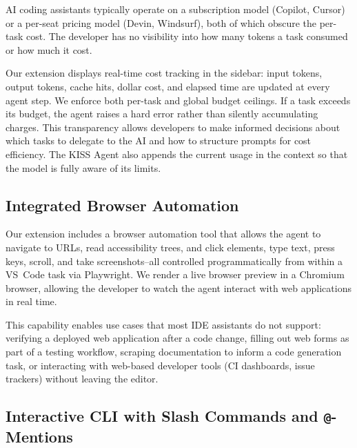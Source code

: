 \documentclass{article}
\begin{document}
AI coding assistants typically operate on a subscription model (Copilot, Cursor) or a per-seat pricing model (Devin, Windsurf), both of which obscure the per-task cost.  The developer has no visibility into how many tokens a task consumed or how much it cost.

Our extension displays real-time cost tracking in the sidebar: input tokens, output tokens, cache hits, dollar cost, and elapsed time are updated at every agent step.  We enforce both per-task and global budget ceilings.  If a task exceeds its budget, the agent raises a hard error rather than silently accumulating charges.  This transparency allows developers to make informed decisions about which tasks to delegate to the AI and how to structure prompts for cost efficiency.  The KISS Agent also appends the current usage in the context so that the model is fully aware of its limits.

\subsection{Integrated Browser Automation}
\label{sec:browser-feature}

Our extension includes a browser automation tool that allows the agent to navigate to URLs, read accessibility trees, and click elements, type text, press keys, scroll, and take screenshots--all controlled programmatically from within a VS~Code task via Playwright. We render a live browser preview in a Chromium browser, allowing the developer to watch the agent interact with web applications in real time.

This capability enables use cases that most IDE assistants do not support: verifying a deployed web application after a code change, filling out web forms as part of a testing workflow, scraping documentation to inform a code generation task, or interacting with web-based developer tools (CI dashboards, issue trackers) without leaving the editor.

\subsection{Interactive CLI with Slash Commands and \texttt{@}-Mentions}
\label{sec:cli-feature}
\end{document}
